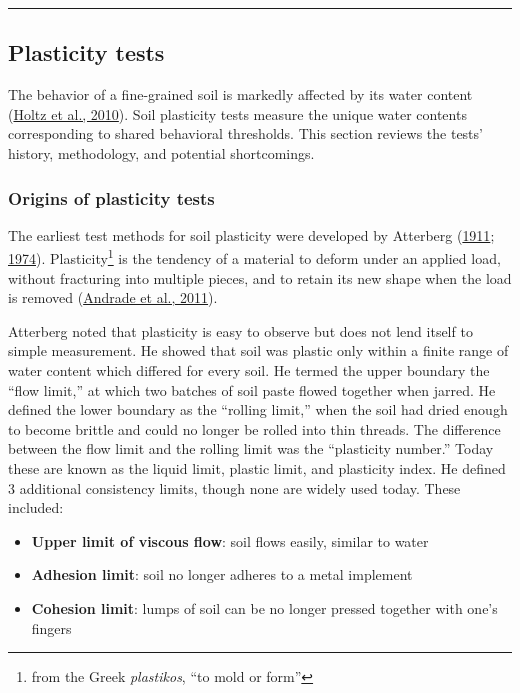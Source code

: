\documentclass[
  letterpaper,
  openany]{book}
\providecommand{\tightlist}{%
  \setlength{\itemsep}{0pt}\setlength{\parskip}{0pt}}
\begin{document}
\begin{center}\rule{0.5\linewidth}{0.5pt}\end{center}

\newpage

\hypertarget{plasticity-tests}{%
\subsection{Plasticity tests}\label{plasticity-tests}}

The behavior of a fine-grained soil is markedly affected by its water content (\protect\hyperlink{ref-Holtz2010}{Holtz et al., 2010}). Soil plasticity tests measure the unique water contents corresponding to shared behavioral thresholds. This section reviews the tests' history, methodology, and potential shortcomings.

\hypertarget{atterberg-limits-origins}{%
\subsubsection{Origins of plasticity tests}\label{atterberg-limits-origins}}

The earliest test methods for soil plasticity were developed by Atterberg (\protect\hyperlink{ref-Atterberg1911}{1911}; \protect\hyperlink{ref-Atterberg1974}{1974}).
Plasticity\footnote{from the Greek \emph{plastikos}, ``to mold or form''} is the tendency of a material to deform under an applied load, without fracturing into multiple pieces, and to retain its new shape when the load is removed (\protect\hyperlink{ref-Andrade2011}{Andrade et al., 2011}).

Atterberg noted that plasticity is easy to observe but does not lend itself to simple measurement.
He showed that soil was plastic only within a finite range of water content which differed for every soil.
He termed the upper boundary the ``flow limit,'' at which two batches of soil paste flowed together when jarred.
He defined the lower boundary as the ``rolling limit,'' when the soil had dried enough to become brittle and could no longer be rolled into thin threads.
The difference between the flow limit and the rolling limit was the ``plasticity number.''
Today these are known as the liquid limit, plastic limit, and plasticity index.
He defined 3 additional consistency limits, though none are widely used today. These included:

\begin{itemize}
\tightlist
\item
  \textbf{Upper limit of viscous flow}: soil flows easily, similar to water
\item
  \textbf{Adhesion limit}: soil no longer adheres to a metal implement
\item
  \textbf{Cohesion limit}: lumps of soil can be no longer pressed together with one's fingers
\end{itemize}
\end{document}
